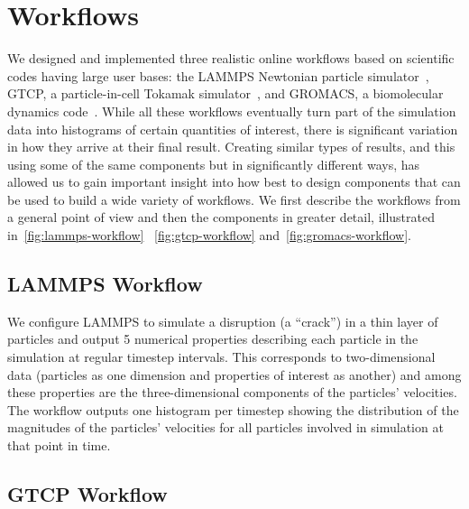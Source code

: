 \section{Workflows}
\label{s:workflows}

We designed and implemented three realistic online workflows based on
scientific codes having large user bases: the LAMMPS Newtonian particle
simulator~\cite{plimpton:1997:lammps}, GTCP, a particle-in-cell Tokamak
simulator~\cite{lin:gtc}, and GROMACS,
a biomolecular dynamics code~\cite{hess2008gromacs}.
While all these workflows eventually turn part of the
simulation data into histograms of certain quantities of interest,
there is significant variation in 
how they
arrive at their final result.
Creating similar types of results, and this using some
of the same components but in significantly
different ways, has allowed us to gain important insight into how best to
design components that can be used to build a wide variety of workflows.
We first describe the workflows from a general point of view
and then the components in greater detail, illustrated
in~\autoref{fig:lammps-workflow} ~\autoref{fig:gtcp-workflow}
and~\autoref{fig:gromacs-workflow}.

\subsection{LAMMPS Workflow}

We configure LAMMPS to simulate a disruption (a ``crack'') in a thin layer of
particles and output 5 numerical properties describing each particle in the
simulation at regular timestep intervals. This corresponds to two-dimensional
data (particles as one dimension and properties of interest as another) and
among these properties are the three-dimensional components of the particles'
velocities. The workflow outputs one histogram per timestep
showing the distribution of the magnitudes of the particles' velocities
for all particles involved in simulation at that point in
time.

\subsection{GTCP Workflow}

